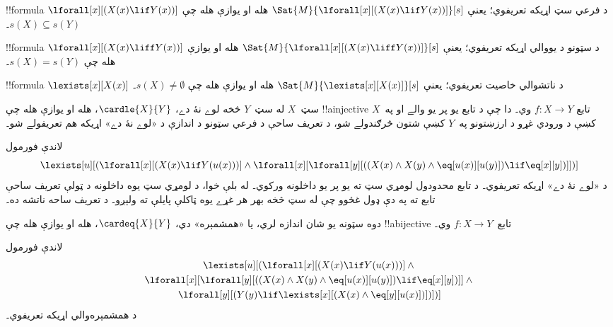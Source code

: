 \documentclass[../../../include/open-logic-section]{subfiles}
\begin{document}


\begin{prop}
!!{formula} $\lforall[x][(X(x) \lif Y(x))]$ د فرعي سټ اړيکه
تعريفوي؛ يعنې $\Sat{M}{\lforall[x][(X(x) \lif Y(x))]}[s]$ هله او
يوازې هله چې $s(X) \subseteq s(Y)$۔
\end{prop}

\begin{prop}
!!{formula} $\lforall[x][(X(x) \liff Y(x))]$ د سټونو د يووالي
اړيکه تعريفوي؛ يعنې $\Sat{M}{\lforall[x][(X(x) \liff Y(x))]}[s]$
هله او يوازې هله چې $s(X) = s(Y)$۔
\end{prop}

\begin{prop}
!!{formula} $\lexists[x][X(x)]$ د ناتشوالي خاصيت تعريفوي؛ يعنې
$\Sat{M}{\lexists[x][X(x)]}[s]$ هله او يوازې هله چې $s(X) \neq
\emptyset$۔
\end{prop}

سټ~$X$ له سټ~$Y$ څخه لوے نۀ دے، $\cardle{X}{Y}$، هله او يوازې
هله چې !!a{injective} تابع $f\colon X \to Y$ وي۔ دا چې د تابع
يو پر يو والے او په~$X$ کښې د ورودي غړو د ارزښتونو په~$Y$
کښې شتون څرګندولے شو، د تعريف ساحې د فرعي سټونو د اندازې د
«لوے نۀ دے» اړيکه هم تعريفولے شو۔

\begin{prop}
لاندې فورمول
\[
\lexists[u][(\lforall[x][(X(x) \lif Y(u(x)))] \land \lforall[x][\lforall[y][((X(x)\land X(y)\land \eq[u(x)][u(y)]) \lif
      \eq[x][y])]])]
\]
د «لوے نۀ دے» اړيکه تعريفوي۔ د تابع محدودول لومړي سټ ته يو پر يو داخلونه ورکوي۔ له بلې خوا، د لومړي سټ يوه داخلونه د ټولې تعريف ساحې تابع ته په دې ډول غځوو چې له سټ څخه بهر هر غړے يوه ټاکلې پايلې ته ولېږو۔ د تعريف ساحه ناتشه ده۔
\end{prop}

دوه سټونه يو شان اندازه لري، يا «همشمېره» دي، $\cardeq{X}{Y}$،
هله او يوازې هله چې !!a{bijective} تابع~$f\colon X \to Y$ وي۔

\begin{prop}
لاندې فورمول
\begin{multline*}
  \lexists[u][(\lforall[x][(X(x) \lif Y(u(x)))] \land {}\\
    \lforall[x][\lforall[y][((X(x) \land X(y) \land \eq[u(x)][u(y)]) \lif \eq[x][y])]]
  \land {} \\\lforall[y][(Y(y) \lif \lexists[x][(X(x)
      \land \eq[y][u(x)])])])]
\end{multline*}
د همشمېره‌والي اړيکه تعريفوي۔
\end{prop}
\end{document}
